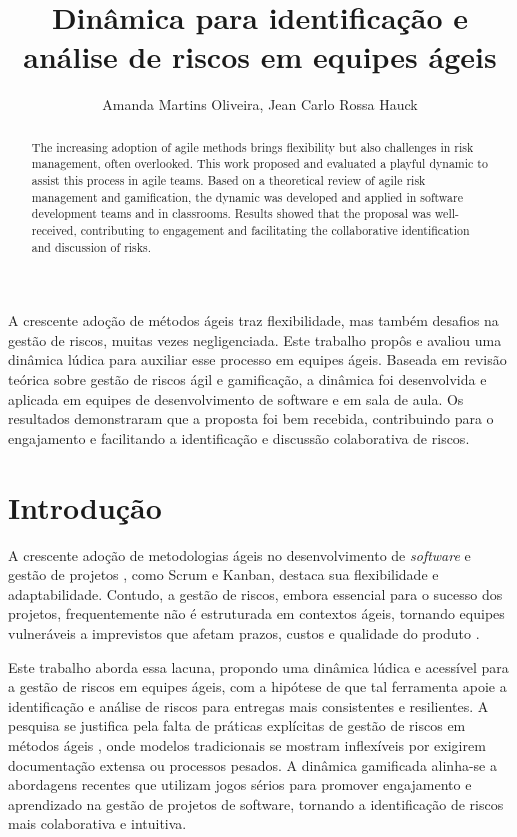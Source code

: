 \documentclass[12pt]{article}
\title{Dinâmica para identificação e análise de riscos em equipes ágeis}
\author{Amanda Martins Oliveira\inst{1}, Jean Carlo Rossa Hauck\inst{1}}
\begin{document}
\maketitle
\begin{abstract}
  The increasing adoption of agile methods brings flexibility but also challenges in risk management, often overlooked. This work proposed and evaluated a playful dynamic to assist this process in agile teams.
  Based on a theoretical review of agile risk management and gamification, the dynamic was developed and applied in software development teams and in classrooms. Results showed that the proposal was well-received, contributing to engagement and facilitating the collaborative identification and discussion of risks.
\end{abstract}

\begin{resumo}
  A crescente adoção de métodos ágeis traz flexibilidade, mas também desafios na gestão de riscos, muitas vezes negligenciada. Este trabalho propôs e avaliou uma dinâmica lúdica para auxiliar esse processo em equipes ágeis.
  Baseada em revisão teórica sobre gestão de riscos ágil e gamificação, a dinâmica foi desenvolvida e aplicada em equipes de desenvolvimento de software e em sala de aula. Os resultados demonstraram que a proposta foi bem recebida, contribuindo para o engajamento e facilitando a identificação e discussão colaborativa de riscos.
\end{resumo}

\section{Introdução}
A crescente adoção de metodologias ágeis no desenvolvimento de \textit{software} e gestão de projetos \cite{AgileManifest, AgileGuide}, como Scrum e Kanban, destaca sua flexibilidade e adaptabilidade. Contudo, a gestão de riscos, embora essencial para o sucesso dos projetos, frequentemente não é estruturada em contextos ágeis, tornando equipes vulneráveis a imprevistos que afetam prazos, custos e qualidade do produto \cite{Afshari, Zahedi}.

Este trabalho aborda essa lacuna, propondo uma dinâmica lúdica e acessível para a gestão de riscos em equipes ágeis, com a hipótese de que tal ferramenta apoie a identificação e análise de riscos para entregas mais consistentes e resilientes. A pesquisa se justifica pela falta de práticas explícitas de gestão de riscos em métodos ágeis \cite{LopesSamueldeSouza2022ARMF}, onde modelos tradicionais se mostram inflexíveis por exigirem documentação extensa ou processos pesados. A dinâmica gamificada alinha-se a abordagens recentes que utilizam jogos sérios para promover engajamento e aprendizado na gestão de projetos de software, tornando a identificação de riscos mais colaborativa e intuitiva.
\end{document}
